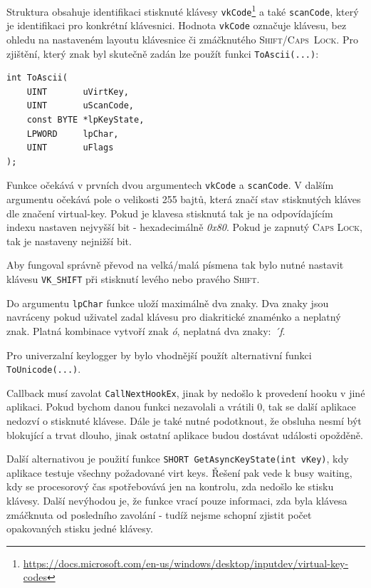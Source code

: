 \documentclass[12pt]{article}
\begin{document}
Struktura obsahuje identifikaci stisknuté klávesy  \texttt{vkCode}\footnote{\url{https://docs.microsoft.com/en-us/windows/desktop/inputdev/virtual-key-codes}} a také  \texttt{scanCode}, který je identifikaci pro konkrétní klávesnici.
Hodnota \texttt{vkCode} označuje klávesu, bez ohledu na nastaveném layoutu klávesnice či zmáčknutého \mbox{\textsc{Shift/Caps Lock}}.
Pro zjištění, který znak byl skutečně zadán lze použít funkci \texttt{ToAscii(...)}:
\begin{verbatim}
int ToAscii(
	UINT       uVirtKey,
	UINT       uScanCode,
	const BYTE *lpKeyState,
	LPWORD     lpChar,
	UINT       uFlags
);
\end{verbatim}

Funkce očekává v prvních dvou argumentech \texttt{vkCode} a \texttt{scanCode}.
V dalším argumentu očekává pole o velikosti 255 bajtů, která značí stav stisknutých kláves dle značení virtual-key.
Pokud je klavesa stisknutá tak je na odpovídajícím indexu nastaven nejvyšší bit - hexadecimálně \textit{0x80}.
Pokud je zapnutý \textsc{Caps Lock}, tak je nastaveny nejnižší bit.

Aby fungoval správně převod na velká/malá písmena tak bylo nutné nastavit klávesu \texttt{VK_SHIFT} při stisknutí levého nebo pravého \textsc{Shift}.

Do argumentu \texttt{lpChar} funkce uloží maximálně dva znaky.
Dva znaky jsou navráceny pokud uživatel zadal klávesu pro diakritické znaménko a neplatný znak. Platná kombinace vytvoří znak \textit{ó}, neplatná dva znaky: \textit{´f}.

Pro univerzalní keylogger by bylo vhodnější použít alternativní funkci \texttt{ToUnicode(...)}.

Callback musí zavolat \texttt{CallNextHookEx}, jinak by nedošlo k provedení hooku v jiné aplikaci.
Pokud bychom danou funkci nezavolali a vrátili 0, tak se další aplikace nedozví o stisknuté klávese.
Dále je také nutné podotknout, že obsluha nesmí být blokující a trvat dlouho, jinak ostatní aplikace budou dostávat události opožděně.

Další alternativou je použití funkce \texttt{SHORT GetAsyncKeyState(int vKey)}, kdy aplikace testuje všechny požadované virt keys. 
Řešení pak vede k busy waiting, kdy se procesorový čas spotřebovává jen na kontrolu, zda nedošlo ke stisku klávesy.
Další nevýhodou je, že funkce vrací pouze informaci, zda byla klávesa zmáčknuta od posledního zavolání - tudíž nejsme schopní zjistit počet opakovaných stisku jedné klávesy.
\end{document}
